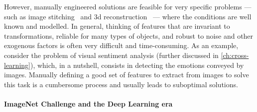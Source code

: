 However, manually engineered solutions are feasible for very specific problems --- such as image stitching~\cite{brown2007automatic} and 3d reconstruction~\cite{schonberger2016structure} --- where the conditions are well known and modelled.
In general, thinking of features that are invariant to transformations, reliable for many types of objects, and robust to noise and other exogenous factors is often very difficult and time-consuming.
As an example, consider the problem of visual sentiment analysis (further discussed in \ref{ch:cross-learning}), which, in a nutshell, consists in detecting the emotions conveyed by images.
Manually defining a good set of features to extract from images to solve this task is a cumbersome process and usually leads to suboptimal solutions.

\paragraph{ImageNet Challenge and the Deep Learning era}

